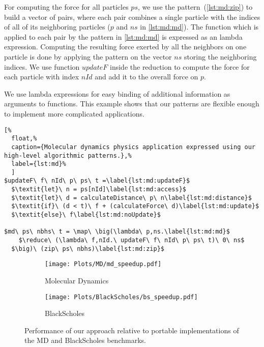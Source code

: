 For computing the force for all particles $ps$, we use the \zip pattern~(\autoref{lst:md:zip}) to build a vector of pairs, where each pair combines a single particle with the indices of all of its neighboring particles ($p$ and $ns$ in \autoref{lst:md:md}).
The function which is applied to each pair by the \map pattern in \autoref{lst:md:md} is expressed as an lambda expression.
Computing the resulting force exerted by all the neighbors on one particle is done by applying the \reduce pattern on the vector $ns$ storing the neighboring indices.
We use function $updateF$ inside the reduction to compute the force for each particle with index $nId$ and add it to the overall force on $p$.

We use lambda expressions for easy binding of additional information as arguments to functions.
This example shows that our patterns are flexible enough to implement more complicated applications.


\begin{lstlisting}[%
  float,%
  caption={Molecular dynamics physics application expressed using our high-level algorithmic patterns.},%
  label={lst:md}%
  ]
$updateF\ f\ nId\ p\ ps\ t =\label{lst:md:updateF}$
  $\textit{let}\ n = ps[nId]\label{lst:md:access}$
  $\textit{let}\ d = calculateDistance\ p\ n\label{lst:md:distance}$
  $\textit{if}\ (d < t)\ f + (calculateForce\ d)\label{lst:md:update}$
  $\textit{else}\ f\label{lst:md:noUpdate}$

$md\ ps\ nbhs\ t = \map\ \big(\lambda\ p,ns.\label{lst:md:md}$
    $\reduce\ (\lambda\ f,nId.\ updateF\ f\ nId\ p\ ps\ t)\ 0\ ns$
  $\big)\ (zip\ ps\ nbhs)\label{lst:md:zip}$
\end{lstlisting}

\begin{figure}[t]
  \centering
  \begin{subfigure}[b]{0.48\linewidth}
    \texttt{[image: Plots/MD/md\_speedup.pdf]}
    \caption{Molecular Dynamics}
    \label{fig:md:results}
  \end{subfigure}
  \hfill
  \begin{subfigure}[b]{0.48\linewidth}
    \texttt{[image: Plots/BlackScholes/bs\_speedup.pdf]}
    \caption{BlackScholes}
    \label{fig:blackScholes:results}
  \end{subfigure}
  \caption[Performance of our approach relative to native \OpenCL implementations of the MD and BlackScholes benchmarks]%
          {Performance of our approach relative to portable \OpenCL implementations of the MD and BlackScholes benchmarks.}
   \label{fig:bs:ms:results}
\end{figure}

